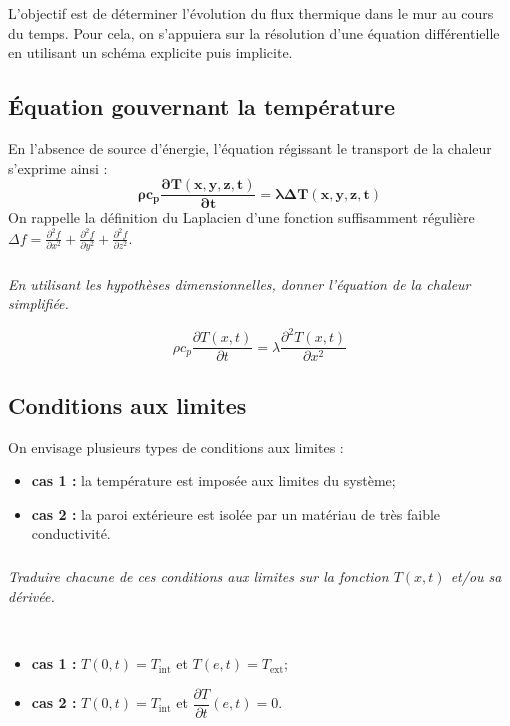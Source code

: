 \documentclass[10pt,fleqn]{article} %
\begin{document}
\begin{obj}
L'objectif est de déterminer l'évolution du flux thermique dans le mur au cours du temps. Pour cela, on s'appuiera sur la résolution d'une équation différentielle en utilisant un schéma explicite puis implicite.
\end{obj}
\fi
\subsection{Équation gouvernant la température}
\ifprof
\else
En l'absence de source d'énergie, l'équation régissant le transport de la chaleur s'exprime ainsi :
\begin{equation}
\mathbf{\rho c_p \dfrac{\partial T(x,y,z,t)}{\partial t} =  \lambda  \Delta T(x,y,z,t)}
\end{equation}
On rappelle la définition du Laplacien d'une fonction suffisamment régulière 
$\Delta f =\frac{\partial^2 f}{\partial x^2}+\frac{\partial^2 f}{\partial y^2}
+\frac{\partial^2 f}{\partial z^2}$.
\fi

\subparagraph{}\textit{En utilisant les hypothèses dimensionnelles, donner l'équation de la chaleur simplifiée. }
\ifprof
\begin{corrige}
$$ 
\rho c_p \dfrac{\partial T(x,t)}{\partial t} =  \lambda  \dfrac{\partial^2 T(x,t)}{\partial x^2}
$$
\end{corrige}
\else
\fi

\subsection{Conditions aux limites}
\ifprof
\else
On envisage  plusieurs types de conditions aux limites :
\begin{itemize}
\item \textbf{cas 1 : } la température est imposée aux limites du système;
\item \textbf{cas 2 : } la paroi extérieure est isolée par un matériau de très faible conductivité. 
\end{itemize}
\fi

\subparagraph{}\textit{Traduire chacune de ces conditions aux limites sur la fonction $T(x,t)$ et/ou sa dérivée.} 
\ifprof
\begin{corrige} ~\\
\begin{itemize}
\item \textbf{cas 1 : } $T(0,t)=T_{\text{int}}$ et $T(e,t)=T_{\text{ext}}$;
\item \textbf{cas 2 : } $T(0,t)=T_{\text{int}}$ et $ \dfrac{\partial T}{\partial t} (e,t)=0$.
\end{itemize}
\end{corrige}
\end{document}
